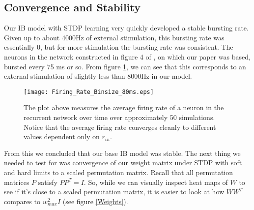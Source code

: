 \subsection{Convergence and Stability}

Our IB model with STDP learning very quickly developed a stable bursting rate. Given up to about 4000Hz of external stimulation, this bursting rate was essentially 0, but for more stimulation the bursting rate was consistent. The neurons in the network constructed in figure 4 of \cite{Fiete}, on which our paper was based, bursted every 75 ms or so. From figure \ref{FR}, we can see that this corresponds to an external stimulation of slightly less than 8000Hz in our model.

\begin{figure}[H]
\centering
\texttt{[image: Firing\_Rate\_Binsize\_80ms.eps]}
\caption{The plot above measures the average firing rate of a neuron in the recurrent network over time over approximately 50 simulations. Notice that the average firing rate converges cleanly to different values dependent only on \(r_{in}\).}
\label{FR}
\end{figure}

From this we concluded that our base IB model was stable. The next thing we needed to test for was convergence of our weight matrix under STDP with soft and hard limits to a scaled permutation matrix. Recall that all permutation matrices \(P\) satisfy \(PP^T = I\). So, while we can visually inspect heat maps of \(W\) to see if it's close to a scaled permutation matrix, it is easier to look at how \(WW^T\) compares to \(w_{max}^2I\) (see figure \ref{Weights}).

